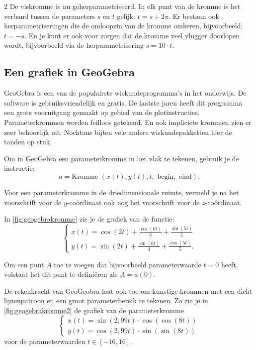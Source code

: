 \begin{multicols}{2}
De viskromme is nu geherparametriseerd. In elk punt van de kromme is het verband tussen de parameters $s$ en $t$ gelijk: $t=s+2\pi$. Er bestaan ook herparametriseringen die de omloopzin van de kromme omkeren, bijvoorbeeld: $t=-s$. En je kunt er ook voor zorgen dat de kromme veel vlugger doorlopen wordt, bijvoorbeeld via de herparametrisering $s=10 \cdot t$.

\subsection{Een grafiek in GeoGebra}

GeoGebra is een van de populairste wiskundeprogramma's in het onderwijs. De software is gebruiksvriendelijk en gratis. De laatste jaren heeft dit programma een grote vooruitgang gemaakt op gebied van de plotinstructies. Parameterkrommen worden feilloos getekend. En ook impliciete krommen zien er zeer behoorlijk uit. Nochtans bijten vele andere wiskundepakketten hier de tanden op stuk.

Om in GeoGebra een parameterkromme in het vlak te tekenen, gebruik je de instructie: 
\[a=\textrm{Kromme } (x(t),y(t), t,\textrm{ begin}, \textrm{ eind}). \]

Voor een parameterkromme in de driedimensionale ruimte, vermeld je na het voorschrift voor de $y$-coördinaat ook nog het voorschrift voor de $z$-coördinaat.

In \autoref{fig:geogebrakromme} zie je de grafiek van de functie:
\[ \begin{cases}
x(t)= \cos(2t)+\frac{\cos(6t)}{3}+\frac{\sin(5t)}{5} \\
y(t)= \sin(2t)+\frac{\sin(6t)}{3}+\frac{\cos(5t)}{5}. 
\end{cases}\]


Om een punt $A$ toe te voegen dat bijvoorbeeld parameterwaarde $t=0$ heeft, volstaat het dit punt te definiëren als $A=a(0).$

De rekenkracht van GeoGeobra laat ook toe om kunstige krommen met een dicht lijnenpatroon en een groot parameterbereik te tekenen. Zo zie je in \autoref{fig:geogebrakromme2} de grafiek van de parameterkromme
\[ \begin{cases}
x(t)= \sin(2,99t)\cdot \cos(\cos(8t)) \\
y(t)= \cos(2,99t)\cdot \sin(\sin(8t))
\end{cases}\]
voor de parameterwaarden $t \in [-16,16]$.


\end{multicols}
